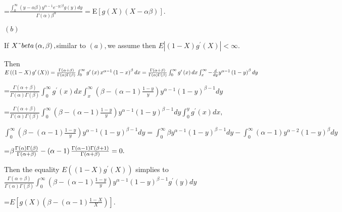 \documentclass{article}
\begin{document}
=$\frac{\int_{0}^{\infty }\left( y-\alpha \beta \right) y^{\alpha
-1}e^{-y/\beta }g\left( y\right) dy}{\Gamma \left( \alpha \right) \beta
^{\alpha }}=$E$\left[ g\left( X\right) \left( X-\alpha \beta \right) \right]
.$

$\left( b\right) $

If $X\symbol{126}beta\left( \alpha ,\beta \right) ,$similar to $\left(
a\right) ,$we assume then $E\left\vert \left( 1-X\right) g^{\prime }\left(
X\right) \right\vert <\infty .$

Then $E\left( \left( 1-X\right) g^{\prime }\left( X\right) \right) =\frac{%
\Gamma \left( \alpha +\beta \right) }{\Gamma \left( \alpha \right) \Gamma
\left( \beta \right) }\int_{0}^{\infty }g^{\prime }\left( x\right) x^{\alpha
-1}\left( 1-x\right) ^{\beta }dx=\frac{\Gamma \left( \alpha +\beta \right) }{%
\Gamma \left( \alpha \right) \Gamma \left( \beta \right) }\int_{0}^{\infty
}g^{\prime }\left( x\right) dx\int_{x}^{\infty }-\frac{d}{dy}y^{\alpha
-1}\left( 1-y\right) ^{\beta }dy$

=$\frac{\Gamma \left( \alpha +\beta \right) }{\Gamma \left( \alpha \right)
\Gamma \left( \beta \right) }\int_{0}^{\infty }g^{\prime }\left( x\right)
dx\int_{x}^{\infty }\left( \beta -\left( \alpha -1\right) \frac{1-y}{y}%
\right) y^{\alpha -1}\left( 1-y\right) ^{\beta -1}dy$

=$\frac{\Gamma \left( \alpha +\beta \right) }{\Gamma \left( \alpha \right)
\Gamma \left( \beta \right) }\int_{0}^{\infty }\left( \beta -\left( \alpha
-1\right) \frac{1-y}{y}\right) y^{\alpha -1}\left( 1-y\right) ^{\beta
-1}dy\int_{0}^{y}g^{\prime }\left( x\right) dx,$

$\int_{0}^{\infty }\left( \beta -\left( \alpha -1\right) \frac{1-y}{y}%
\right) y^{\alpha -1}\left( 1-y\right) ^{\beta -1}dy=\int_{0}^{\infty }\beta
y^{\alpha -1}\left( 1-y\right) ^{\beta -1}dy-\int_{0}^{\infty }\left( \alpha
-1\right) y^{\alpha -2}\left( 1-y\right) ^{\beta }dy$

=$\beta \frac{\Gamma \left( \alpha \right) \Gamma \left( \beta \right) }{%
\Gamma \left( \alpha +\beta \right) }-\left( \alpha -1\right) \frac{\Gamma
\left( \alpha -1\right) \Gamma \left( \beta +1\right) }{\Gamma \left( \alpha
+\beta \right) }=0.$

Then the equality $E\left( \left( 1-X\right) g^{\prime }\left( X\right)
\right) $ simplies to $\frac{\Gamma \left( \alpha +\beta \right) }{\Gamma
\left( \alpha \right) \Gamma \left( \beta \right) }\int_{0}^{\infty }\left(
\beta -\left( \alpha -1\right) \frac{1-y}{y}\right) y^{\alpha -1}\left(
1-y\right) ^{\beta -1}g^{\prime }\left( y\right) dy$

=$E\left[ g\left( X\right) \left( \beta -\left( \alpha -1\right) \frac{1-X}{X%
}\right) \right] .$
\end{document}
